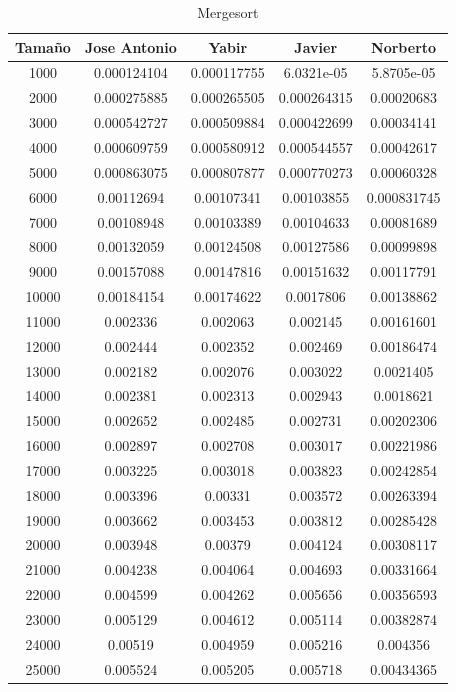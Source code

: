 \documentclass[11pt,a4paper]{article}
\begin{document}
\begin{table}[h]
	\centering
	\caption{Mergesort}
	\begin{tabular}{ | c | c  | c | c | c | }
		\hline
		Tama\~no & Jose Antonio & Yabir & Javier & Norberto\\
		\hline
		1000	&	0.000124104	&	0.000117755	&	6.0321e-05	&	5.8705e-05	\\
		2000	&	0.000275885	&	0.000265505	&	0.000264315	&	0.00020683	\\
		3000	&	0.000542727	&	0.000509884	&	0.000422699	&	0.00034141	\\
		4000	&	0.000609759	&	0.000580912	&	0.000544557	&	0.00042617	\\
		5000	&	0.000863075	&	0.000807877	&	0.000770273	&	0.00060328	\\
		6000	&	0.00112694	&	0.00107341	&	0.00103855	&	0.000831745	\\
		7000	&	0.00108948	&	0.00103389	&	0.00104633	&	0.00081689	\\
		8000	&	0.00132059	&	0.00124508	&	0.00127586	&	0.00099898	\\
		9000	&	0.00157088	&	0.00147816	&	0.00151632	&	0.00117791	\\
		10000	&	0.00184154	&	0.00174622	&	0.0017806	&	0.00138862	\\
		11000	&	0.002336	&	0.002063	&	0.002145	&	0.00161601	\\
		12000	&	0.002444	&	0.002352	&	0.002469	&	0.00186474	\\
		13000	&	0.002182	&	0.002076	&	0.003022	&	0.0021405	\\
		14000	&	0.002381	&	0.002313	&	0.002943	&	0.0018621	\\
		15000	&	0.002652	&	0.002485	&	0.002731	&	0.00202306	\\
		16000	&	0.002897	&	0.002708	&	0.003017	&	0.00221986	\\
		17000	&	0.003225	&	0.003018	&	0.003823	&	0.00242854	\\
		18000	&	0.003396	&	0.00331	&	0.003572	&	0.00263394	\\
		19000	&	0.003662	&	0.003453	&	0.003812	&	0.00285428	\\
		20000	&	0.003948	&	0.00379	&	0.004124	&	0.00308117	\\
		21000	&	0.004238	&	0.004064	&	0.004693	&	0.00331664	\\
		22000	&	0.004599	&	0.004262	&	0.005656	&	0.00356593	\\
		23000	&	0.005129	&	0.004612	&	0.005114	&	0.00382874	\\
		24000	&	0.00519	&	0.004959	&	0.005216	&	0.004356	\\
		25000	&	0.005524	&	0.005205	&	0.005718	&	0.00434365	\\
		\hline
	\end{tabular}
\end{table}
\end{document}
